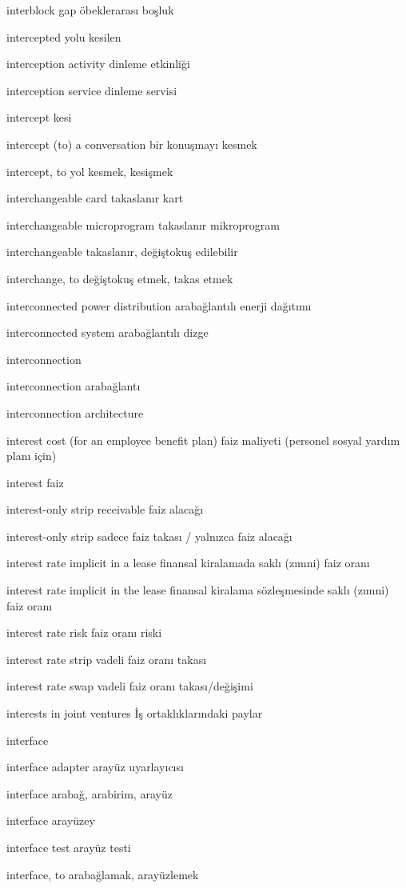 \documentclass[12pt,fleqn]{article}\usepackage{../../common}
\begin{document}
interblock gap öbeklerarası boşluk

intercepted yolu kesilen

interception activity dinleme etkinliği

interception service dinleme servisi

intercept kesi

intercept (to) a conversation bir konuşmayı kesmek

intercept, to yol kesmek, kesişmek

interchangeable card takaslanır kart

interchangeable microprogram takaslanır mikroprogram

interchangeable takaslanır, değiştokuş edilebilir

interchange, to değiştokuş etmek, takas etmek

interconnected power distribution arabağlantılı enerji dağıtımı

interconnected system arabağlantılı dizge

interconnection

interconnection arabağlantı

interconnection architecture

interest cost (for an employee benefit plan) faiz maliyeti (personel sosyal yardım planı için)

interest faiz

interest-only strip receivable faiz alacağı

interest-only strip sadece faiz takası / yalnızca faiz alacağı

interest rate implicit in a lease finansal kiralamada saklı (zımni) faiz oranı

interest rate implicit in the lease finansal kiralama sözleşmesinde saklı (zımni) faiz oranı

interest rate risk faiz oranı riski

interest rate strip vadeli faiz oranı takası

interest rate swap vadeli faiz oranı takası/değişimi

interests in joint ventures İş ortaklıklarındaki paylar

interface

interface adapter arayüz uyarlayıcısı

interface arabağ, arabirim, arayüz

interface arayüzey

interface test arayüz testi

interface, to arabağlamak, arayüzlemek
\end{document}
